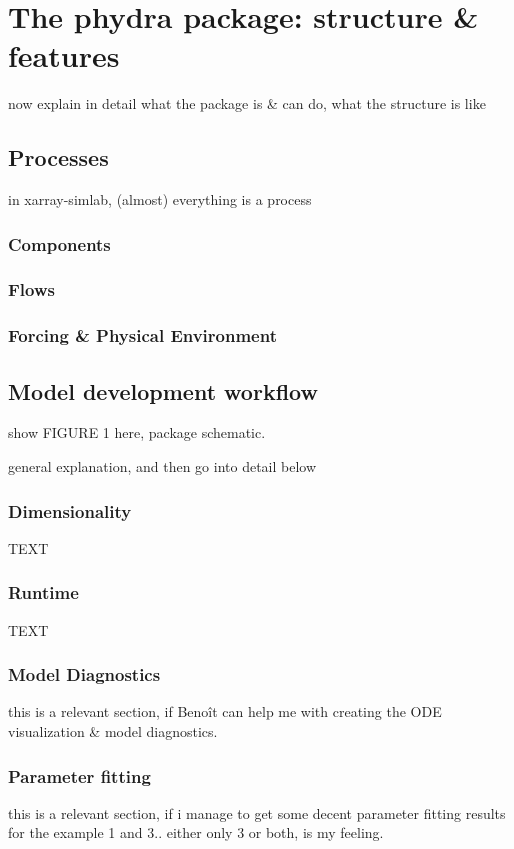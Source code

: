 \documentclass[journal abbreviation, manuscript]{copernicus}
\begin{document}
\section{The phydra package: structure \& features}

now explain in detail what the package is \& can do, what the structure is like

\subsection{Processes}
in xarray-simlab, (almost) everything is a process

\subsubsection{Components}
\subsubsection{Flows}
\subsubsection{Forcing & Physical Environment}

\subsection{Model development workflow}
show FIGURE 1 here, package schematic.

general explanation, and then go into detail below

\subsubsection{Dimensionality}
TEXT

\subsubsection{Runtime}
TEXT

\subsubsection{Model Diagnostics}
this is a relevant section, if Benoît can help me with creating the ODE visualization & model diagnostics.

\subsubsection{Parameter fitting}
this is a relevant section, if i manage to get some decent parameter fitting results for the example 1 and 3.. either only 3 or both, is my feeling. 
\end{document}
